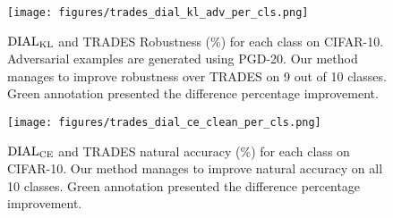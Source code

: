 \begin{figure}[!ht]
  \centering
  \texttt{[image: figures/trades\_dial\_kl\_adv\_per\_cls.png]}
  \caption{$\operatorname{DIAL}_{\operatorname{KL}}$ and TRADES Robustness (\%) for each class on CIFAR-10. Adversarial examples are generated using PGD-20. Our method manages to improve robustness over TRADES on 9 out of 10 classes. Green annotation presented the difference percentage improvement.}
  \label{trades-dial-adv}
\end{figure}

\begin{figure}[!ht]
  \centering
  \texttt{[image: figures/trades\_dial\_ce\_clean\_per\_cls.png]}
  \caption{$\operatorname{DIAL}_{\operatorname{CE}}$ and TRADES natural accuracy (\%) for each class on CIFAR-10. Our method manages to improve natural accuracy on all 10 classes. Green annotation presented the difference percentage improvement.}
  \label{trades-dial-clean}
\end{figure}


